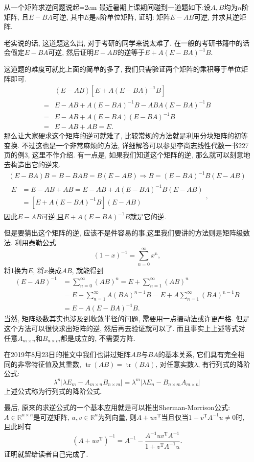 \documentclass[UTF8,no-math,12pt,openany,table,dvipsnames,svgnames]{book}
\DeclareMathOperator{\tr}{tr}
\begin{document}
\begin{MYBOX}[colbacktitle=blue]{从一个矩阵求逆问题说起}\parindent=2em
最近暑期上课期间碰到一道题如下:设$A,B$均为$n$阶矩阵, 且$E-BA$可逆, 其中$E$是$n$阶单位矩阵, 证明: 矩阵$E-AB$可逆, 并求其逆矩阵.

老实说的话, 这道题这么出, 对于考研的同学来说太难了. 在一般的考研书籍中的话会假定$E-BA$可逆, 然后证明$E-AB$的逆等于$E+A(E-BA)^{-1}B$.

这道题的难度可就比上面的简单的多了, 我们只需验证两个矩阵的乘积等于单位矩阵即可. 
\begin{align*}
  &(E-AB)[E+A(E-BA)^{-1}B] \\
  ={}& E-AB+A(E-BA)^{-1}B-ABA(E-BA)^{-1}B\\
  ={}& E-AB+A(E-BA)(E-BA)^{-1}B\\
  ={}& E-AB+AB=E.
\end{align*}
那么让大家硬求这个矩阵的逆可就难了, 比较常规的方法就是利用分块矩阵的初等变换. 不过这也是一个非常麻烦的方法, 详细解答可以参见李尚志线性代数一书227页的例3, 这里不作介绍. 有一点是, 如果我们知道这个矩阵的逆, 那么就可以刻意地去构造出它的逆来.
\begin{gather*}
  (E-BA)B = B - BAB = B(E-AB)\Rightarrow B=(E-BA)^{-1}B(E-AB)\\
  \begin{aligned}
    E& = E-AB+AB = E-AB+A(E-BA)^{-1}B(E-AB)\\
     & = [E+A(E-BA)^{-1}B](E-AB)
  \end{aligned},
\end{gather*}
因此$E-AB$可逆,且$E+A(E-BA)^{-1}B$就是它的逆.

但是要猜出这个矩阵的逆, 应该不是件容易的事,这里我们要讲的方法则是矩阵级数法. 利用泰勒公式
\[
  (1-x)^{-1}=\sum_{n=0}^\infty x^n,
\]
将1换为$E$, 将$x$换成$AB$, 就能得到
\begin{align*}
  (E-AB)^{-1} & = \sum_{n=0}^\infty (AB)^n = E+\sum_{n=1}^\infty(AB)^n\\
  & = E+\sum_{n=1}^\infty A(BA)^{n-1}B = E+A\sum_{n=1}^\infty(BA)^{n-1}B\\
  & = E+A(E-BA)^{-1}B.
\end{align*}
当然, 矩阵级数其实也涉及到收敛半径的问题, 需要用一点摄动法或许更严格. 但是这个方法可以很快求出矩阵的逆, 然后再去验证就可以了. 而且事实上上述等式对任意$A_{m\times n}$和$B_{n\times m}$都是成立的, 不需要方阵.

在2019年8月23日的推文中我们也讲过矩阵$AB$与$BA$的基本关系, 它们具有完全相同的非零特征值及其重数, $\tr(AB)=\tr(BA)$, 对任意实数$\lambda$, 有行列式的降阶公式:
\[ 
  \lambda^n|\lambda E_m- A_{m\times n}B_{n\times m}|
  = \lambda^m|\lambda E_n-B_{n\times m} A_{m\times n}|
\]
上述公式称为行列式的降阶公式. 

最后, 原来的求逆公式的一个基本应用就是可以推出Sherman-Morrison公式: $A\in\mathbb R^{n\times n}$是可逆矩阵, $u,v\in\mathbb R^n$为列向量, 则$A+uv^{\mathrm T}$当且仅当$1+v^{\mathrm T}A^{-1}u\ne0$时, 且此时有
\[
  (A+uv^{\mathrm T})^{-1}= A^{-1} - \frac{A^{-1}uv^{\mathrm T}A^{-1}}{1+v^{\mathrm T}A^{-1}u}.
\]
证明就留给读者自己完成了.
\end{MYBOX}
\end{document}
